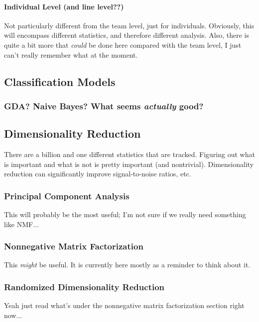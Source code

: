 \documentclass{notes}
\begin{document}
        \paragraph{Individual Level (and line level??)}\hfill

          Not particularly different from the team level, just for individuals.
          Obviously, this will encompass different statistics, and therefore different analysis.
          Also, there is quite a bit more that \emph{could} be done here compared with the team level, I just can't really remember what at the moment.


    \subsection{Classification Models}

      \subsubsection{GDA? Naive Bayes? What seems \emph{actually} good?}


    \subsection{Dimensionality Reduction}
      There are a billion and one different statistics that are tracked.
      Figuring out what is important and what is not is pretty important (and nontrivial).
      Dimensionality reduction can significantly improve signal-to-noise ratios, etc.

      \subsubsection{Principal Component Analysis}
        This will probably be the most useful; I'm not sure if we really need something like NMF...

      \subsubsection{Nonnegative Matrix Factorization}
        This \emph{might} be useful.
        It is currently here mostly as a reminder to think about it.

      \subsubsection{Randomized Dimensionality Reduction}
        Yeah just read what's under the nonnegative matrix factorization section right now...
\end{document}
